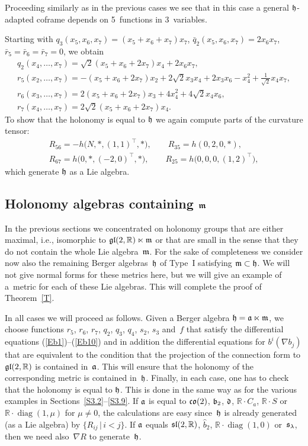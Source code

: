 \documentclass[pdftex]{sigma}
\numberwithin{equation}{section}
\newcommand\fh{{\frak h}}
\newcommand\fm{{\frak m}}
\newcommand\fa{{\frak a}}
\newcommand\fb{{\frak b}}
\newcommand\fd{{\frak d}}
\newcommand\fs{{\frak s}}
\newcommand{\fgl}{\mathop{{\frak g \frak l}}}
\newcommand{\fsl}{\mathop{{\frak s \frak l}}}
\newcommand{\fco}{\mathop{{\frak c \frak o}}}
\newcommand\RR{{\mathbb R}}
\newcommand{\diag}{\operatorname{diag}}
\begin{document}
\begin{Remark} Proceeding similarly as in the previous cases we see that in this case a general $\fh$-adapted coframe depends on 5~functions in 3~variables.
\end{Remark}

\begin{Example} Starting with $q_3(x_5,x_6,x_7)=(x_5+ x_6+x_7)x_7$, $\bar q_2(x_5,x_6,x_7)=2x_6x_7$, $\bar r_5=\bar r_6=\bar r_7=0$, we obtain
\begin{gather*}
q_2(x_4,\dots,x_7) = \sqrt2(x_5+x_6+2 x_7)x_4+2x_6 x_7 ,\\
r_5(x_2,\dots, x_7) = -(x_5+x_6+2 x_7)x_2+2 \sqrt2 x_3x_4+2 x_3x_6-x_4^2+ \tfrac1{\sqrt2} x_4x_7,\\
r_6(x_3,\dots,x_7) = 2(x_5+x_6+2x_7) x_3+4x_4^2+4\sqrt2 x_4 x_6,\\
r_7(x_4,\dots, x_7) = 2\sqrt 2(x_5+x_6+2x_7)x_4 .
\end{gather*}
To show that the holonomy is equal to $\fh$ we again compute parts of the curvature tensor:
\begin{gather*}
 R_{56}=-h\big(N,*,(1,1)^\top,*\big),\qquad R_{35}=h(0,2,0,*),\\
 R_{67}= h\big(0,*,(-2,0)^\top,*\big),\qquad R_{25}= h\big(0,0,0,(1,2)^\top\big),
 \end{gather*}
which generate $\fh$ as a Lie algebra.
\end{Example}

\subsection[Holonomy algebras containing $\fm$]{Holonomy algebras containing $\boldsymbol{\fm}$}
In the previous sections we concentrated on holonomy groups that are either maximal, i.e., isomorphic to $\fgl(2,\RR)\ltimes\fm$ or that are small in the sense that they do not contain the whole Lie algebra~$\fm$. For the sake of completeness we consider now also the remaining Berger algebras~$\fh$ of Type~I satisfying $\fm\subset \fh$. We will not give normal forms for these metrics here, but we will give an example of a~metric for each of these Lie algebras. This will complete the proof of Theorem~\ref{T}.

In all cases we will proceed as follows. Given a Berger algebra $\fh=\fa\ltimes\fm$, we choose functions $r_5$, $r_6$, $r_7$, $q_2$, $q_3$, $q_4$, $s_2$, $s_3$ and~$f$ that satisfy the differential equations (\ref{Eb1})--(\ref{Eb10}) and in addition the differential equations for $b^i(\nabla b_j)$ that are equivalent to the condition that the projection of the connection form to $\fgl(2,\RR)$ is contained in~$\fa$. This will ensure that the holonomy of the corresponding metric is contained in~$\fh$. Finally, in each case, one has to check that the holonomy is equal to $\fh$. This is done in the same way as for the various examples in Sections~\ref{S3.2}--\ref{S3.9}. If $\fa$ is equal to $\fco(2)$, $\fb_2$, $\fd$, $\RR\cdot C_a$, $\RR\cdot S$ or~$\RR\cdot \diag(1,\mu)$ for $\mu\not=0$, the calculations are easy since~$\fh$ is already generated (as a Lie algebra) by $\{R_{ij}\,|\, i<j\}$. If $\fa$ equals $\fsl(2,\RR)$, $\hat b_2$, $\RR\cdot\diag(1,0)$ or~$\fs_\lambda$, then we need also~$\nabla R$ to generate~$\fh$.
\end{document}

